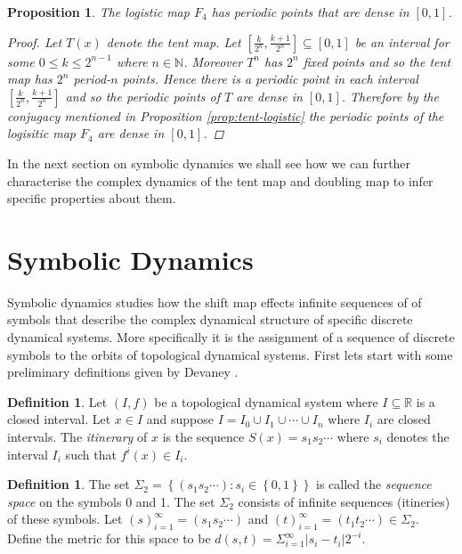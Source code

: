 \documentclass[11pt,a4paper,oneside]{memoir}
\theoremstyle{plain}
\newtheorem{prop}[thm]{Proposition}
\theoremstyle{definition}
\newtheorem{defn}[thm]{Definition}
\begin{document}
\begin{prop} \label{prop:logisitc-periodic-dense}
    The logistic map $F_4$ has periodic points that are dense in $[0, 1]$.
    \begin{proof}
    Let $T(x)$ denote the tent map. Let $\left[\frac{k}{2^n}, \frac{k+1}{2^n}\right] \subseteq [0, 1]$ be an interval for some $0 \leq k \leq 2^{n-1}$ where $n \in \mathbb{N}$. Moreover $T^n$ has $2^n$ fixed points and so the tent map has $2^n$ period-$n$ points. Hence there is a periodic point in each interval $\left[\frac{k}{2^n}, \frac{k+1}{2^n}\right]$ and so the periodic points of $T$ are dense in $[0, 1]$. Therefore by the conjugacy mentioned in Proposition \ref{prop:tent-logistic} the periodic points of the logisitic map $F_4$ are dense in $[0, 1]$.
    \end{proof}
\end{prop}

In the next section on symbolic dynamics we shall see how we can further characterise the complex dynamics of the tent map and doubling map to infer specific properties about them.

\section{Symbolic Dynamics}
Symbolic dynamics studies how the shift map effects infinite sequences of of symbols that describe the complex dynamical structure of specific discrete dynamical systems. More specifically it is the assignment of a sequence of discrete symbols to the orbits of topological dynamical systems. First lets start with some preliminary definitions given by Devaney \cite[Section 1.6]{devaney}.

\begin{defn}
    Let $(I, f)$ be a topological dynamical system where $I \subseteq \mathbb{R}$ is a closed interval. Let $x \in I$ and suppose $I = I_0 \cup I_1 \cup \cdots \cup I_n$ where $I_i$ are closed intervals. The \emph{itinerary} of $x$ is the sequence $S(x) = s_1s_2\cdots$ where $s_i$ denotes the interval $I_i$ such that $f^i(x) \in I_i$.
\end{defn}

\begin{defn}
    The set $\Sigma_2 = \left\lbrace (s_1s_2\cdots): s_i \in \left\lbrace 0, 1 \right\rbrace \right\rbrace$ is called the \emph{sequence space} on the symbols 0 and 1. The set $\Sigma_2$ consists of infinite sequences (itineries) of these symbols. Let $(s)_{i=1}^{\infty} = (s_1s_2\cdots)$ and $(t)_{i=1}^{\infty} = (t_1t_2\cdots) \in \Sigma_2$. Define the metric for this space to be $d(s, t) = \Sigma_{i=1}^{\infty}|s_i - t_i|2^{-i}$.
\end{defn}
\end{document}
